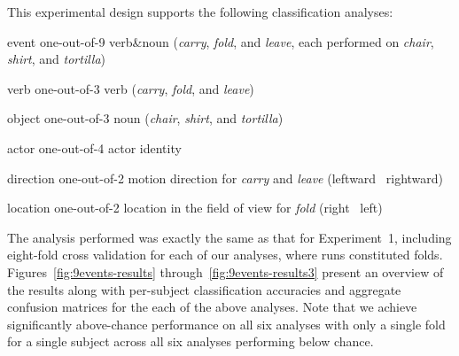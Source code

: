 This experimental design supports the following classification analyses:
%
\begin{compactdesc}
\item[event] one-out-of-9 verb\&noun (\emph{carry}, \emph{fold}, and
  \emph{leave}, each performed on \emph{chair}, \emph{shirt}, and
  \emph{tortilla})
\item[verb] one-out-of-3 verb (\emph{carry}, \emph{fold}, and \emph{leave})
\item[object] one-out-of-3 noun (\emph{chair}, \emph{shirt}, and
  \emph{tortilla})
\item[actor] one-out-of-4 actor identity
\item[direction] one-out-of-2 motion direction for \emph{carry} and \emph{leave}
  (leftward \vs\ rightward)
\item[location] one-out-of-2 location in the field of view for \emph{fold}
  (right \vs\ left)
\end{compactdesc}
%
The analysis performed was exactly the same as that for Experiment~1,
including eight-fold cross validation for each of our analyses, where runs
constituted folds.
%
Figures~\ref{fig:9events-results} through~\ref{fig:9events-results3}
present an overview of the results along with per-subject
classification accuracies and aggregate confusion matrices for the
each of the above analyses.
%
Note that we achieve significantly above-chance performance on all six analyses
with only a single fold for a single subject across all six analyses
performing below chance.

